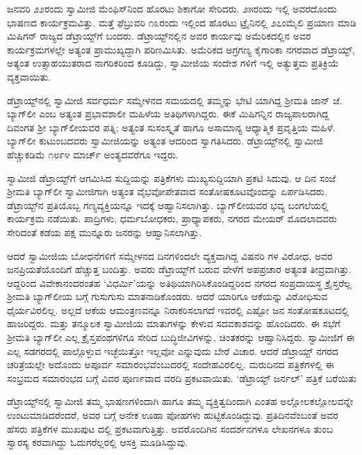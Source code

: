 ಜನವರಿ ೨೨ರಂದು ಸ್ವಾಮೀಜಿ ಮೆಂಫಿಸ್​ನಿಂದ ಹೊರಟು ಶಿಕಾಗೋ ಸೇರಿದರು. ೨೫ರಂದು ಇಲ್ಲಿ ಅವರದೊಂದು ಭಾಷಣದ ಕಾರ್ಯಕ್ರಮವಿತ್ತು. ಮತ್ತೆ ಫೆಬ್ರುವರಿ ೧೩ರಂದು ಇಲ್ಲಿಂದ ಹೊರಟು ಟ್ರೈನಿನಲ್ಲಿ ೨೭ಂಮೈಲಿ ಪ್ರಯಾಣ ಮಾಡಿ ಮಿಷಿಗನ್ ರಾಜ್ಯದ ಡೆಟ್ರಾಯ್ಟ್​ಗೆ ಬಂದರು. ಡೆಟ್ರಾಯ್ಟ್​ನಲ್ಲಿನ ಅವರ ಕಾರ್ಯವು ಅಮೆರಿಕದಲ್ಲಿನ ಅವರ ಕಾರ್ಯಕ್ರಮಗಳಲ್ಲೇ ಅತ್ಯಂತ ಪ್ರಾಮುಖ್ಯದ್ದಾಗಿ ಪರಿಣಮಿಸಿತು. ಅಮೆರಿಕದ ಅಗ್ರಗಣ್ಯ ಕೈಗಾರಿಕಾ ನಗರವಾದ ಡೆಟ್ರಾಯ್ಟ್, ಅತ್ಯಂತ ಉತ್ಸಾಹಯುತರಾದ ನಾಗರಿಕರಿಂದ ಕೂಡಿದ್ದು, ಸ್ವಾಮೀಜಿಯ ಸಂದೇಶ ಗಳಿಗೆ ಇಲ್ಲಿ ಅತ್ಯುತ್ತಮ ಪ್ರತಿಕ್ರಿಯೆ ವ್ಯಕ್ತವಾಯಿತು.

ಡೆಟ್ರಾಯ್ಟ್​ನಲ್ಲಿ ಸ್ವಾಮೀಜಿ ಸರ್ವಧರ್ಮ ಸಮ್ಮೇಳನದ ಸಮಯದಲ್ಲಿ ತಮ್ಮನ್ನು ಭೇಟಿ ಯಾಗಿದ್ದ ಶ್ರೀಮತಿ ಜಾನ್ ಜೆ. ಬ್ಯಾಗ್​ಲೀ ಎಂಬ ಅತ್ಯಂತ ಪ್ರಭಾವಶಾಲೀ ಮಹಿಳೆಯ ಅತಿಥಿಗಳಾಗಿದ್ದರು. ಈಕೆ ಮಿಷಿಗನ್ನಿನ ರಾಜ್ಯಪಾಲರಾಗಿದ್ದ ದಿವಂಗತ ಶ್ರೀ ಬ್ಯಾಗ್​ಲೀಯವರ ಪತ್ನಿ; ಅತ್ಯಂತ ಸುಸಂಸ್ಕೃತೆ ಹಾಗೂ ಅಸಾಮಾನ್ಯ ಆಧ್ಯಾತ್ಮಿಕ ಪ್ರವೃತ್ತಿಯ ಮಹಿಳೆ. ಬ್ಯಾಗ್​ಲೀ ಕುಟುಂಬದವರು ಸ್ವಾಮೀಜಿಯನ್ನು ಅತ್ಯಂತ ಆದರಿಂದ ಸ್ವಾಗತಿಸಿದರು. ಡೆಟ್ರಾಯ್ಟ್​ನಲ್ಲಿ ಸ್ವಾಮೀಜಿ ಹೆಚ್ಚುಕಡಿಮೆ ೧೮೯೪ ಮಾರ್ಚ್ ಅಂತ್ಯದವರೆಗೂ ಇದ್ದರು.

ಸ್ವಾಮೀಜಿ ಡೆಟ್ರಾಯ್ಟ್​ಗೆ ಆಗಮಿಸಿದ ಸುದ್ದಿಯನ್ನು ಪತ್ರಿಕೆಗಳು ಮುಖ್ಯಸುದ್ದಿಯಾಗಿ ಪ್ರಕಟಿ ಸಿದುವು. ಆ ದಿನ ಸಂಜೆ ಶ್ರೀಮತಿ ಬ್ಯಾಗ್​ಲೀ ಸ್ವಾಮೀಜಿಗಾಗಿ ಅತ್ಯಂತ ವೈಭವೋಪೇತವಾದ ಸಂತೋಷಕೂಟವೊಂದನ್ನು ಏರ್ಪಡಿಸಿದರು. ಡೆಟ್ರಾಯ್ಟ್​ನ ಪ್ರತಿಯೊಬ್ಬ ಗಣ್ಯವ್ಯಕ್ತಿಯನ್ನೂ ಇದಕ್ಕೆ ಆಹ್ವಾನಿಸಲಾಗಿತ್ತು. ಬ್ಯಾಗ್​ಲೀಯವರ ಭವ್ಯ ಬಂಗಲೆಯಲ್ಲಿ ಕಾರ್ಯಕ್ರಮ ನಡೆಯಿತು. ಪಾದ್ರಿಗಳು, ಧರ್ಮಬೋಧಕರು, ಪ್ರಾಧ್ಯಾಪಕರು, ನಗರದ ಮೇಯರ್ ಮೊದಲಾದವರು ಸೇರಿದಂತೆ ಕಡೆಯ ಪಕ್ಷ ಮುನ್ನೂರು ಜನರನ್ನು ಆಹ್ವಾನಿಸಲಾಗಿತ್ತು.

ಆದರೆ ಸ್ವಾಮೀಜಿಯ ಬೋಧನೆಗಳಿಗೆ ಸಮ್ಮೇಳನದ ದಿನಗಳಿಂದಲೇ ವ್ಯಕ್ತವಾಗಿದ್ದ ವಿಷನರಿ ಗಳ ವಿರೋಧ, ಅವರ ಜನಪ್ರಿಯತೆಯೊಂದಿಗೆ ಹೆಚ್ಚುತ್ತ ಬಂದಿತ್ತು. ಅವರು ಡೆಟ್ರಾಯ್ಟ್​ಗೆ ಬರುವ ವೇಳೆಗೆ ಅಪಪ್ರಚಾರ ಅತ್ಯಂತ ತೀವ್ರವಾಗಿತ್ತು. ಆದ್ದರಿಂದ ವಿವೇಕಾನಂದರಂತಹ ‘ವಿಧರ್ಮಿ’ಯನ್ನು ಅತಿಥಿಯಾಗಿರಿಸಿಕೊಂಡಿದ್ದರಿಂದ ನಗರದ ಸಂಪ್ರದಾಯಸ್ಥ ಕ್ರೈಸ್ತರೆಲ್ಲ ಶ್ರೀಮತಿ ಬ್ಯಾಗ್​ಲೀಯ ಬಗ್ಗೆ ಗುಸುಗುಸು ಮಾತನಾಡಿಕೊಂಡರು. ಆದರೆ ಯಾರಿಗೂ ಆಕೆಯನ್ನು ವಿರೋಧಿಸುವ ಧೈರ್ಯವಿರಲಿಲ್ಲ. ಅಲ್ಲದೆ ಆಕೆಯ ಆಮಂತ್ರಣವನ್ನೂ ನಿರಾಕರಿಸಲಾಗದೆ ಇವರಲ್ಲಿ ಎಷ್ಟೋ ಜನ ಸಂತೋಷಕೂಟದಲ್ಲಿ ಹಾಜರಿದ್ದರು. ಮತ್ತು ತನ್ಮೂಲಕ ಸ್ವಾಮೀಜಿಯ ಮಾತುಗಳನ್ನು ಕೇಳುವ ಸದವಕಾಶವನ್ನು ಹೊಂದಿದರು. ಈ ಸಭೆಗೆ ಶ್ರೀಮತಿ ಬ್ಯಾಗ್​ಲೀ ಎಲ್ಲ ಕ್ರೈಸ್ತಪಂಥಗಳಿಗೂ ಸೇರಿದ ಬುದ್ಧಿಜೀವಿಗಳನ್ನು, ಚಿಂತಕರನ್ನು ಆಹ್ವಾನಿಸಿದ್ದರು. ಸ್ವಾಮೀಜಿಗೆ ಈ ಎಲ್ಲ ಸಡಗರದಲ್ಲಿ ಪಾಲ್ಗೊಳ್ಳುವ ಇಚ್ಛೆಯಿತ್ತೋ ಇಲ್ಲವೋ ಎನ್ನುವುದು ಬೇರೆ ವಿಚಾರ. ಆದರೆ ಡೆಟ್ರಾಯ್ಟ್ ನಗರದ ಚರಿತ್ರೆಯಲ್ಲೇ ಅದೊಂದು ಅಪೂರ್ವ ಸಮಾರಂಭವೆಂಬುದರಲ್ಲಿ ಸಂದೇಹವಿರಲಿಲ್ಲ. ಮರುದಿನದ ಪತ್ರಿಕೆಗಳಲ್ಲಿ ಈ ಸಂಭ್ರಮದ ಸಮಾರಂಭದ ಬಗ್ಗೆ ವಿವರ ಪೂರ್ಣವಾದ ವರದಿ ಪ್ರಕಟವಾಯಿತು. ‘ಡೆಟ್ರಾಯ್ಟ್ ಜರ್ನಲ್​’ ಪತ್ರಿಕೆ ಬರೆಯಿತು

ಡೆಟ್ರಾಯ್ಟ್​ನಲ್ಲಿ ಸ್ವಾಮೀಜಿ ತಮ್ಮ ಭಾಷಣಗಳಿಂದಾಗಿ ಹಾಗೂ ತಮ್ಮ ವ್ಯಕ್ತಿತ್ವದಿಂದಾಗಿ ಎಂತಹ ಅಲ್ಲೋಲಕಲ್ಲೋಲವನ್ನೇ ಉಂಟುಮಾಡಿದರೆಂದರೆ, ಅವರ ಬಗ್ಗೆ ಅನೇಕ ಊಹಾ ಪೋಹಗಳು ಹುಟ್ಟಿಕೊಂಡಿದ್ದುವು. ಪ್ರತಿದಿನವೆಂಬಂತೆ ಅವರ ಹೆಸರು ಪತ್ರಿಕೆಗಳ ಮುಖಪುಟ ದಲ್ಲಿ ಪ್ರಕಟವಾಗುತ್ತಿತ್ತು. ಅವರೊಂದಿಗಿನ ಸಂದರ್ಶನಗಳೂ ಲೇಖನಗಳೂ ತುಂಬ ಸ್ವಾರಸ್ಯ ಕರವಾಗಿದ್ದು ಓದುಗರೆಲ್ಲರಲ್ಲಿ ಆಸಕ್ತಿ ಮೂಡಿಸಿದ್ದುವು.

